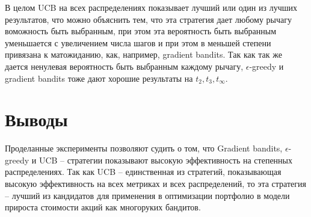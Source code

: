 \documentclass{article}
\begin{document}
В целом UCB на всех распределениях показывает лучший или один из лучших результатов, что можно объяснить тем, что эта стратегия дает любому рычагу воможность быть выбранным, при этом эта вероятность быть выбранным уменьшается с увеличением числа шагов и при этом в меньшей степени привязана к матожиданию, как, например, gradient bandits. Так как так же дается ненулевая вероятность быть выбранным каждому рычагу, $\epsilon$-greedy и gradient bandits тоже дают хорошие результаты на $t_2, t_3, t_{\infty}$.

\section{Выводы}

Проделанные эксперименты позволяют судить о том, что Gradient bandits, $\epsilon$-greedy и UCB -- стратегии показывают высокую эффективность на степенных распределениях. Так как UCB -- единственная из стратегий, показывающая высокую эффективность на всех метриках и всех распределений, то эта стратегия -- лучший из кандидатов для применения в оптимизации портфолио в модели прироста стоимости акций как многоруких бандитов.



\end{document}
